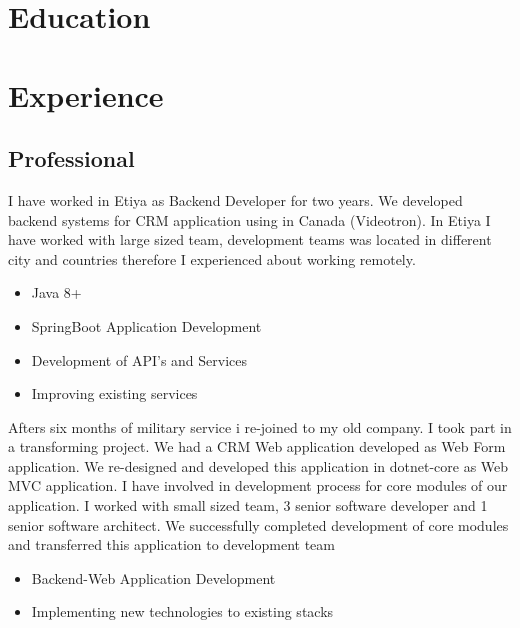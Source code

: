 \documentclass[11pt,a4paper,sans]{moderncv}
\begin{document}
\makecvtitle
\section{Education}

\section{Experience}
\subsection{Professional}
{
	\textnormal
	{
		I have worked in Etiya as Backend Developer for two years. We developed backend systems for CRM application using in Canada (Videotron). In Etiya I have worked with large sized team, development teams was located in different city and countries therefore I experienced about working remotely.
	}
	\\
	\begin{itemize}%
		\item Java 8+
		\item SpringBoot Application Development
		\item Development of API's and Services
		\item Improving existing services \\
	\end{itemize}
}
{
	\textnormal
	{
		Afters six months of military service i re-joined to my old company. I took part in a transforming project. We had a CRM Web application developed as Web Form application. We re-designed and developed this application in dotnet-core as Web MVC application. I have involved in development process for core modules of our application. I worked with small sized team, 3 senior software developer and 1 senior software architect. We successfully completed development of core modules and transferred this application to development team
	}
	\\
	\begin{itemize}%
		\item Backend-Web Application Development
		\item Implementing new technologies to existing stacks \\
	\end{itemize}
}
\end{document}
